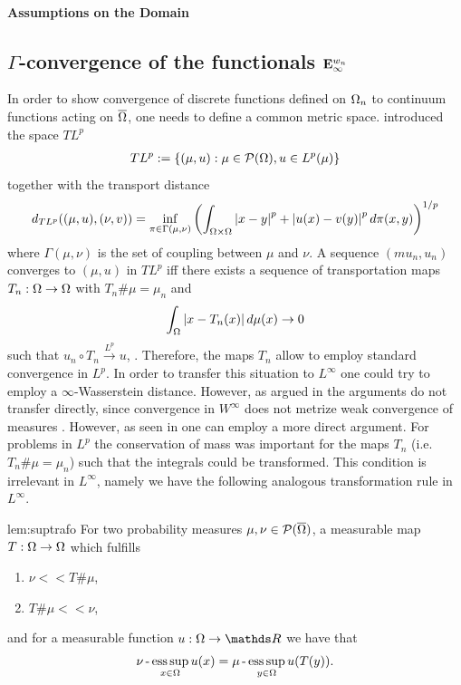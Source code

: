 %
%
\paragraph{Assumptions on the Domain}
%
%
%

%
\subsection{$\Gamma$-convergence of the functionals $\mathbf{E}^{w_n}_\infty$}
%

%
%
In order to show convergence of discrete functions defined on $\Omega_n$ to continuum functions acting on $\overline{\Omega}$, one needs to define a common metric space. \cite{GarcSlep15} introduced the space $TL^p$
%
\begin{align*}
TL^p :=\left\{(\mu, u): \mu\in \mathcal{P}(\Omega), u\in L^p(\mu)\right\}
\end{align*}
%
together with the transport distance
%
\begin{align*}
d_{TL^p}((\mu, u), (\nu, v)) = \inf_{\pi\in \Gamma(\mu,\nu)}
\left(\int_{\Omega\times\Omega} \left|x-y\right|^p + \left|u(x) - v(y)\right|^p d\pi(x,y)\right)^{1/p}
\end{align*}
%
where $\Gamma(\mu,\nu)$ is the set of coupling between $\mu$ and $\nu$. A sequence $(mu_n, u_n)$ converges to $(\mu,u)$ in $TL^p$ iff there exists a sequence of transportation maps $T_n:\Omega\to\Omega$ with $T_n\#\mu = \mu_n$ and 
%
\begin{align*}
\int_{\Omega} \left|x- T_n(x)\right| d\mu(x)\rightarrow 0
\end{align*}
%
such that $u_n\circ T_n \xrightarrow{L^p} u$, \cite[Prop. 3.12]{GarcSlep15}. Therefore, the maps $T_n$ allow to employ standard convergence in $L^p$. In order to transfer this situation to $L^\infty$ one could try to employ a $\infty$-Wasserstein distance. However, as argued in \cite{roith2022msc} the arguments do not transfer directly, since convergence in $W^\infty$ does not metrize weak convergence of measures \cite[Thm. 5.10]{santambrogio2015optimal}. However, as seen in \cite{roith2022continuum} one can employ a more direct argument. For problems in $L^p$ the conservation of mass was important for the maps $T_n$ (i.e. $T_n\#\mu = \mu_n$) such that the integrals could be transformed. This condition is irrelevant in $L^\infty$, namely we have the following analogous transformation rule in $L^\infty$.
%
\begin{lemma}{\cite[Lem. 2]{roith2022continuum}}{lem:suptrafo}
For two probability measures $\mu,\nu \in \mathcal{P}(\overline{\Omega})$, a measurable map 
$T:\Omega\rightarrow\Omega$ which fulfills
\begin{enumerate}[label=\upshape(\roman*)]
\item $\nu<<T\#\mu$,
\item $T\# \mu<<\nu$,
\end{enumerate}
and for a measurable function $u:\domain\rightarrow\R$ we have that
\begin{align*}
\nu\operatorname{-}\operatorname*{ess\,sup}_{x\in\Omega} u(x) = \mu\operatorname{-}\operatorname*{ess\,sup}_{y\in\Omega} u(T(y)).
\end{align*}
\end{lemma}
